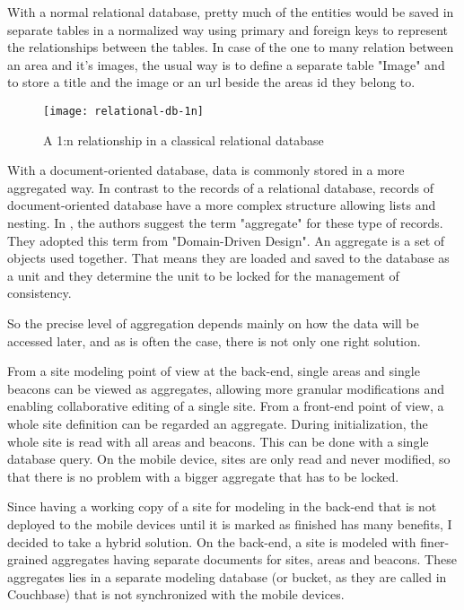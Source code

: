With a normal relational database, pretty much of the entities would be saved in separate tables in a normalized way using primary and foreign keys to represent the relationships between the tables. In case of the one to many relation between an area and it's images, the usual way is to define a separate table "Image" and to store a title and the image or an url beside the areas id they belong to.

\begin{figure}[H]
\centering
\texttt{[image: relational-db-1n]}
\caption{A 1:n relationship in a classical relational database}
\end{figure}

With a document-oriented database, data is commonly stored in a more aggregated way. In contrast to the records of a relational database, records of document-oriented database have a more complex structure allowing lists and nesting. In \cite{nosqldistilled}, the authors suggest the term "aggregate" for these type of records. They adopted this term from \cite{domaindriven} "Domain-Driven Design". An aggregate is a set of objects used together. That means they are loaded and saved to the database as a unit and they determine the unit to be locked for the management of consistency.  

So the precise level of aggregation depends mainly on how the data will be accessed later, and as is often the case, there is not only one right solution. 

From a site modeling point of view at the back-end, single areas and single beacons can be viewed as aggregates, allowing more granular modifications and enabling collaborative editing of a single site.
From a front-end point of view, a whole site definition can be regarded an aggregate. During initialization, the whole site is read with all areas and beacons. This can be done with a single database query. On the mobile device, sites are only read and never modified, so that there is no problem with a bigger aggregate that has to be locked.

Since having a working copy of a site for modeling in the back-end that is not deployed to the mobile devices until it is marked as finished has many benefits, I decided to take a hybrid solution. On the back-end, a site is modeled with finer- grained aggregates having separate documents for sites, areas and beacons. These aggregates lies in a separate modeling database (or bucket, as they are called in Couchbase) that is not synchronized with the mobile devices.

